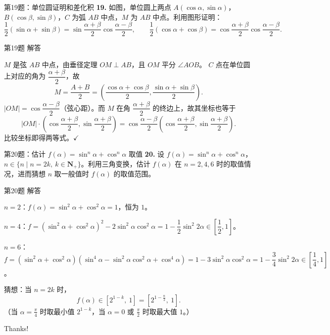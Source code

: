 \documentclass[10pt,aspectratio=169,serif]{beamer}
\begin{document}
\begin{frame}[t]{第19题：单位圆证明和差化积}
\textbf{19.} 如图，单位圆上两点 $A(\cos\alpha,\sin\alpha)$，$B(\cos\beta,\sin\beta)$，$C$ 为弧 $AB$ 中点，$M$ 为 $AB$ 中点。利用图形证明：
\[
\frac12(\sin\alpha+\sin\beta)=\sin\frac{\alpha+\beta}{2}\cos\frac{\alpha-\beta}{2},\qquad
\frac12(\cos\alpha+\cos\beta)=\cos\frac{\alpha+\beta}{2}\cos\frac{\alpha-\beta}{2}.
\]
\end{frame}

\begin{frame}[t]{第19题 解答}
\begin{tcolorbox}[colback=orange!10,colframe=orange,title=\textbf{证明}]
$M$ 是弦 $AB$ 中点，由垂径定理 $OM\perp AB$，且 $OM$ 平分 $\angle AOB$。
$C$ 点在单位圆上对应的角为 $\dfrac{\alpha+\beta}{2}$，故
\[
M=\frac{A+B}{2}=\left(\frac{\cos\alpha+\cos\beta}{2},\frac{\sin\alpha+\sin\beta}{2}\right).
\]
$|OM|=\cos\dfrac{\alpha-\beta}{2}$（弦心距）。而 $M$ 在角 $\dfrac{\alpha+\beta}{2}$ 的终边上，故其坐标也等于
\[
|OM|\cdot\left(\cos\frac{\alpha+\beta}{2},\sin\frac{\alpha+\beta}{2}\right)
=\cos\frac{\alpha-\beta}{2}\left(\cos\frac{\alpha+\beta}{2},\sin\frac{\alpha+\beta}{2}\right).
\]
比较坐标即得两等式。$\checkmark$
\end{tcolorbox}
\end{frame}

\begin{frame}[t]{第20题：估计 $f(\alpha)=\sin^n\alpha+\cos^n\alpha$ 取值}
\textbf{20.} 设 $f(\alpha)=\sin^n\alpha+\cos^n\alpha$，$n\in\{n\mid n=2k,\ k\in\mathbf{N}_+\}$。利用三角变换，估计 $f(\alpha)$ 在 $n=2,4,6$ 时的取值情况，进而猜想 $n$ 取一般值时 $f(\alpha)$ 的取值范围。
\end{frame}

\begin{frame}[t]{第20题 解答}
\begin{tcolorbox}[colback=orange!10,colframe=orange,title=\textbf{解}]
$n=2$：$f(\alpha)=\sin^2\alpha+\cos^2\alpha=1$，恒为 $1$。

$n=4$：$f=(\sin^2\alpha+\cos^2\alpha)^2-2\sin^2\alpha\cos^2\alpha=1-\dfrac12\sin^2 2\alpha\in\left[\dfrac12,1\right]$。

$n=6$：$f=(\sin^2\alpha+\cos^2\alpha)(\sin^4\alpha-\sin^2\alpha\cos^2\alpha+\cos^4\alpha)=1-3\sin^2\alpha\cos^2\alpha=1-\dfrac34\sin^2 2\alpha\in\left[\dfrac14,1\right]$。

\alert{猜想}：当 $n=2k$ 时，
\[
f(\alpha)\in\left[2^{1-k},\ 1\right]=\left[2^{1-\frac{n}{2}},\ 1\right].
\]
（当 $\alpha=\frac{\pi}{4}$ 时取最小值 $2^{1-k}$，当 $\alpha=0$ 或 $\frac{\pi}{2}$ 时取最大值 $1$。）
\end{tcolorbox}
\end{frame}

\begin{frame}[c]
  \begin{center}
    {\Huge\calligra Thanks!}
  \end{center}
\end{frame}
\end{document}
